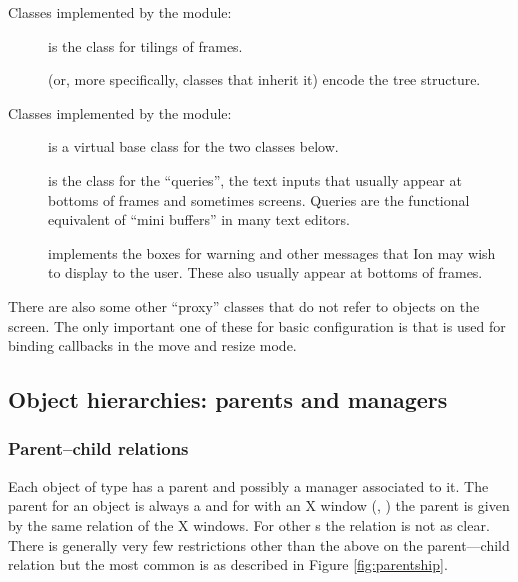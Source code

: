 Classes implemented by the  module:

\begin{description}
  \item[] is the class for tilings
    of frames.
  \item[] (or, more specifically, classes
    that inherit it) encode the  tree structure.
\end{description}


Classes implemented by the  module:

\begin{description}
  \item[] is a virtual base class for the
    two classes below.
  \item[] is the class for the ``queries'',
    the text inputs that usually appear at bottoms of frames and sometimes
    screens. Queries are the functional equivalent of ``mini buffers'' in
    many text editors.
  \item[] implements the boxes for 
    warning and other messages that Ion may wish to display to the user. 
    These also usually appear at bottoms of frames.
\end{description}

There are also some other ``proxy'' classes that do not refer
to objects on the screen. The only important one of these for
basic configuration is  that is used for
binding callbacks in the move and resize mode.


\subsection{Object hierarchies:  parents and managers}

\subsubsection{Parent--child relations}
Each object of type  has a parent and possibly a manager
associated to it. The parent for an object is always a 
 and for  with an X window (,
) the parent  is given by the same relation of
the X windows. For other s the relation is not as clear.
There is generally very few restrictions other than the above on the
parent---child relation but the most common is as described in
Figure \ref{fig:parentship}.

